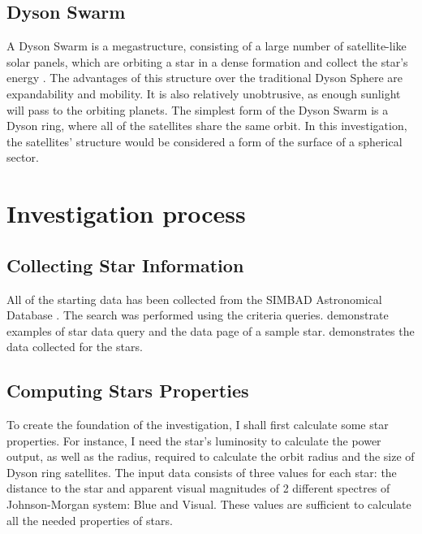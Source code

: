 \documentclass[stu, 11pt, a4paper, floatsintext]{apa7}
\begin{document}
	\subsection{Dyson Swarm}
	A Dyson Swarm is a megastructure, consisting of a large number of satellite-like solar panels, which are orbiting a star in a dense formation and collect the star's energy \Parencite{kochai_pioneering_2020}. The advantages of this structure over the traditional Dyson Sphere are expandability and mobility. It is also relatively unobtrusive, as enough sunlight will pass to the orbiting planets. The simplest form of the Dyson Swarm is a Dyson ring, where all of the satellites share the same orbit. In this investigation, the satellites' structure would be considered a form of the surface of a spherical sector.
	\section{Investigation process}
	\subsection{Collecting Star Information}
	All of the starting data has been collected from the SIMBAD Astronomical Database \Parencite{wenger_simbad_2000}. The search was performed using the criteria queries.  demonstrate examples of star data query and the data page of a sample star.  demonstrates the data collected for the stars.
	\subsection{Computing Stars Properties}
	To create the foundation of the investigation, I shall first calculate some star properties. For instance, I need the star's luminosity to calculate the power output, as well as the radius, required to calculate the orbit radius and the size of Dyson ring satellites. The input data consists of three values for each star: the distance to the star and apparent visual magnitudes of 2 different spectres of Johnson-Morgan system: Blue and Visual. These values are sufficient to calculate all the needed properties of stars.
\end{document}
